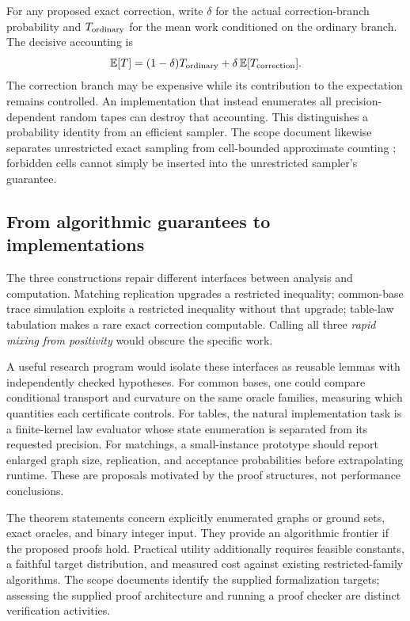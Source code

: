 For any proposed exact correction, write \(\delta\) for the actual
correction-branch probability and \(T_{\rm ordinary}\) for the mean work
conditioned on the ordinary branch. The decisive accounting is
\[
\mathbb E[T]=(1-\delta)T_{\rm ordinary}
+\delta\,\mathbb E[T_{\rm correction}].
\]
The correction branch may be expensive while its contribution to the
expectation remains controlled. An implementation that instead enumerates
all precision-dependent random tapes can destroy that accounting. This
distinguishes a probability identity from an efficient sampler.
The scope document likewise separates unrestricted exact sampling from
cell-bounded approximate counting \cite{FrontScope115}; forbidden cells
cannot simply be inserted into the unrestricted sampler's guarantee.

\subsection{From algorithmic guarantees to implementations}

The three constructions repair different interfaces between analysis and
computation. Matching replication upgrades a restricted inequality;
common-base trace simulation exploits a restricted inequality without
that upgrade; table-law tabulation makes a rare exact correction computable.
Calling all three \emph{rapid mixing from positivity} would obscure the
specific work.

A useful research program would isolate these interfaces as reusable
lemmas with independently checked hypotheses. For common bases, one could
compare conditional transport and curvature on the same oracle families,
measuring which quantities each certificate controls. For tables, the
natural implementation task is a finite-kernel law evaluator whose state
enumeration is separated from its requested precision. For matchings, a
small-instance prototype should report enlarged graph size, replication,
and acceptance probabilities before extrapolating runtime. These are
proposals motivated by the proof structures, not performance conclusions.

The theorem statements concern explicitly enumerated graphs or ground sets,
exact oracles, and binary integer input. They provide an algorithmic frontier
if the proposed proofs hold. Practical utility additionally requires feasible
constants, a faithful target distribution, and measured cost against existing
restricted-family algorithms. The scope documents identify the supplied
formalization targets; assessing the supplied proof architecture and
running a proof checker are distinct verification activities.

